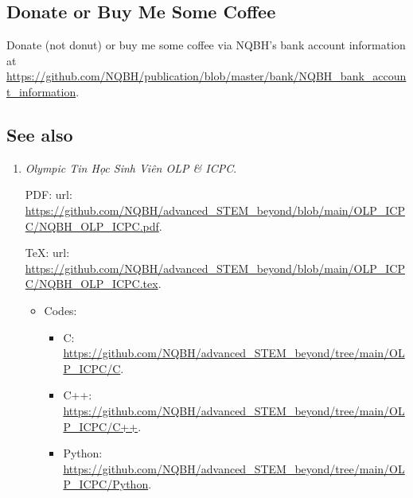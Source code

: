 \documentclass{article}
\begin{document}
\subsection{Donate or Buy Me Some Coffee}
Donate (not donut) or buy me some coffee via NQBH's bank account information at \url{https://github.com/NQBH/publication/blob/master/bank/NQBH_bank_account_information}.

\subsection{See also}

\begin{enumerate}
	\item {\it Olympic Tin Học Sinh Viên OLP \& ICPC}.
	
	PDF: {\sc url}: \url{https://github.com/NQBH/advanced_STEM_beyond/blob/main/OLP_ICPC/NQBH_OLP_ICPC.pdf}.
	
	\TeX: {\sc url}: \url{https://github.com/NQBH/advanced_STEM_beyond/blob/main/OLP_ICPC/NQBH_OLP_ICPC.tex}.
	\begin{itemize}
		\item Codes:
		\begin{itemize}
			\item C: \url{https://github.com/NQBH/advanced_STEM_beyond/tree/main/OLP_ICPC/C}.
			\item C++: \url{https://github.com/NQBH/advanced_STEM_beyond/tree/main/OLP_ICPC/C++}.
			\item Python: \url{https://github.com/NQBH/advanced_STEM_beyond/tree/main/OLP_ICPC/Python}.
		\end{itemize}
	\end{itemize}
\end{enumerate}


\printbibliography[heading=bibintoc]
	
\end{document}
